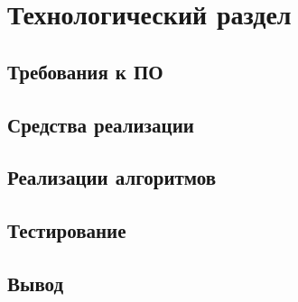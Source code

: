 \chapter{Технологический раздел}
\label{cha:impl}

\section{Требования к ПО}

\section{Средства реализации}

\section{Реализации алгоритмов}

\section{Тестирование}

\section{Вывод}


